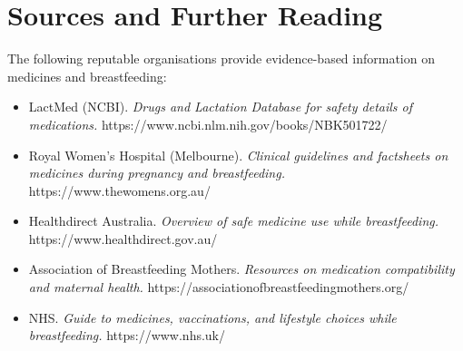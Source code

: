 \section*{Sources and Further Reading}
The following reputable organisations provide evidence-based information on medicines and breastfeeding:
\begin{itemize}
    \item LactMed (NCBI). \textit{Drugs and Lactation Database for safety details of medications.} https://www.ncbi.nlm.nih.gov/books/NBK501722/
    \item Royal Women's Hospital (Melbourne). \textit{Clinical guidelines and factsheets on medicines during pregnancy and breastfeeding.} https://www.thewomens.org.au/
    \item Healthdirect Australia. \textit{Overview of safe medicine use while breastfeeding.} https://www.healthdirect.gov.au/
    \item Association of Breastfeeding Mothers. \textit{Resources on medication compatibility and maternal health.} https://associationofbreastfeedingmothers.org/
    \item NHS. \textit{Guide to medicines, vaccinations, and lifestyle choices while breastfeeding.} https://www.nhs.uk/
\end{itemize}
